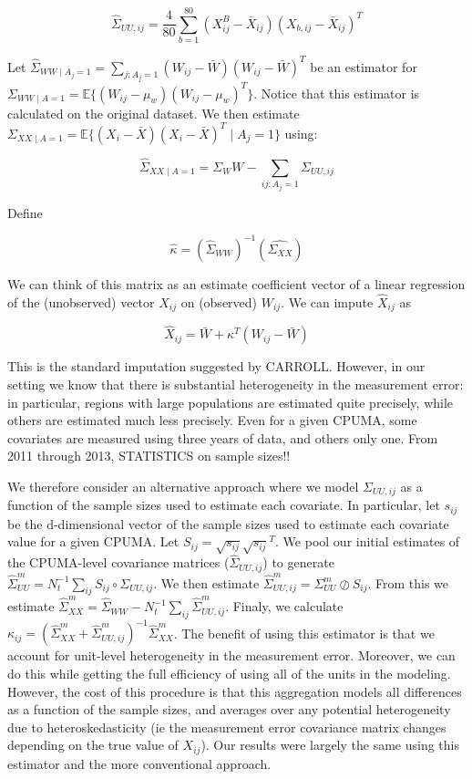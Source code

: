 \documentclass[12pt]{article}
\begin{document}
$$
\hat{\Sigma}_{UU, ij} = \frac{4}{80}\sum_{b=1}^{80}(X_{ij}^B - \bar{X}_{ij})(X_{b, ij} - \bar{X}_{ij})^T
$$

Let $\hat{\Sigma}_{WW \mid A_j = 1} = \sum_{j: A_j = 1} (W_{ij} - \bar{W})(W_{ij} - \bar{W})^T$ be an estimator for $\Sigma_{WW \mid A = 1} = \mathbb{E}\{(W_{ij} - \mu_w)(W_{ij} - \mu_w)^T\}$. Notice that this estimator is calculated on the original dataset. We then estimate $\Sigma_{XX \mid A = 1} = \mathbb{E}\{(X_i - \bar{X})(X_i - \bar{X})^T \mid A_j = 1\}$ using:

$$
\hat{\Sigma}_{XX \mid A = 1} = \Sigma_WW - \sum_{ij: A_j = 1} \Sigma_{UU, ij}
$$

Define

$$
\hat{\kappa} = (\hat{\Sigma}_{WW})^{-1}(\hat{\Sigma_{XX}})
$$

We can think of this matrix as an estimate coefficient vector of a linear regression of the (unobserved) vector $X_{ij}$ on (observed) $W_{ij}$. We can impute $\hat{X}_{ij}$ as

$$
\hat{X}_{ij} = \bar{W} + \kappa^T(W_{ij} - \bar{W})
$$

This is the standard imputation suggested by CARROLL. However, in our setting we know that there is substantial heterogeneity in the measurement error: in particular, regions with large populations are estimated quite precisely, while others are estimated much less precisely. Even for a given CPUMA, some covariates are measured using three years of data, and others only one. From 2011 through 2013, STATISTICS on sample sizes!!

We therefore consider an alternative approach where we model $\Sigma_{UU, ij}$ as a function of the sample sizes used to estimate each covariate. In particular, let $s_{ij}$ be the d-dimensional vector of the sample sizes used to estimate each covariate value for a given CPUMA. Let $S_{ij} = \sqrt{s_{ij}}\sqrt{s_{ij}}^T$. We pool our initial estimates of the CPUMA-level covariance matrices ($\hat{\Sigma}_{UU, ij}$) to generate $\hat{\Sigma}_{UU}^m = N_t^{-1}\sum_{ij} S_{ij} \circ \Sigma_{UU, ij}$. We then estimate $\hat{\Sigma}_{UU, ij}^m = \Sigma_{UU}^m \oslash S_{ij}$. From this we estimate $\hat{\Sigma}^m_{XX} = \hat{\Sigma}_{WW} - N_t^{-1}\sum_{ij}\hat{\Sigma}^m_{UU, ij}$. Finaly, we calculate $\kappa_{ij} = (\hat{\Sigma}^m_{XX} + \hat{\Sigma}^m_{UU, ij})^{-1}\hat{\Sigma}^m_{XX}$. The benefit of using this estimator is that we account for unit-level heterogeneity in the measurement error. Moreover, we can do this while getting the full efficiency of using all of the units in the modeling. However, the cost of this procedure is that this aggregation models all differences as a function of the sample sizes, and averages over any potential heterogeneity due to heteroskedasticity (ie the measurement error covariance matrix changes depending on the true value of $X_{ij}$). Our results were largely the same using this estimator and the more conventional approach.
\end{document}
